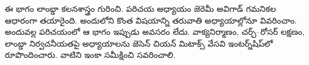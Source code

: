 \documentclass[../../include/open-logic-part]{subfiles}
\begin{document}

\begin{editorial}
ఈ భాగం లాంబ్డా కలనశాస్త్రం గురించి. పరిచయ అధ్యాయం జెరెమీ అవిగాడ్
గమనికల ఆధారంగా తయారైంది. అందులోని కొంత విషయాన్ని తరువాతి అధ్యాయాల్లోనూ వివరించాం.
అందువల్ల పరిచయంలో ఆ భాగం ఇప్పుడు అవసరం లేదు. వాక్యనిర్మాణం, చర్చ్--రోసర్ లక్షణం,
లాంబ్డా నిర్వచనీయతపై అధ్యాయాలను జెసెన్ చియన్ మిటాక్స్ వేసవి
ఇంటర్న్‌షిప్‌లో రూపొందించారు. వాటిని ఇంకా సమీక్షించి సవరించాలి.
\end{editorial}





\OLEndPartHook
\end{document}

